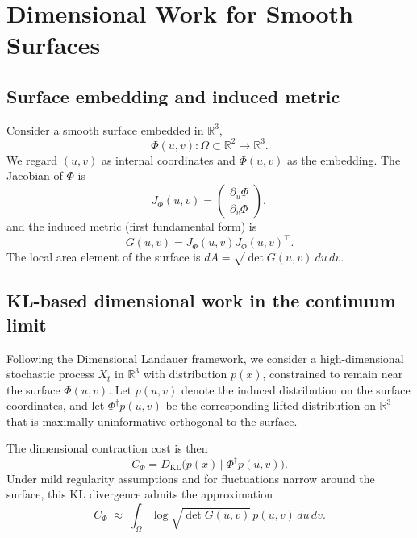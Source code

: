 \documentclass[aps,pre,twocolumn,superscriptaddress,floatfix]{revtex4-2}
\begin{document}
\section{Dimensional Work for Smooth Surfaces}

\subsection{Surface embedding and induced metric}

Consider a smooth surface embedded in $\mathbb{R}^3$,
\begin{equation}
\Phi(u,v): \Omega \subset \mathbb{R}^2 \to \mathbb{R}^3.
\end{equation}
We regard $(u,v)$ as internal coordinates and $\Phi(u,v)$ as the embedding. The Jacobian of $\Phi$ is
\begin{equation}
J_\Phi(u,v) =
\begin{pmatrix}
\partial_u \Phi \\[3pt]
\partial_v \Phi
\end{pmatrix},
\end{equation}
and the induced metric (first fundamental form) is
\begin{equation}
G(u,v) = J_\Phi(u,v) J_\Phi(u,v)^\top.
\end{equation}
The local area element of the surface is $dA = \sqrt{\det G(u,v)}\,du\,dv$.

\subsection{KL-based dimensional work in the continuum limit}

Following the Dimensional Landauer framework, we consider a high-dimensional stochastic process $X_t$ in $\mathbb{R}^3$ with distribution $p(x)$, constrained to remain near the surface $\Phi(u,v)$. Let $p(u,v)$ denote the induced distribution on the surface coordinates, and let $\Phi^\dagger p(u,v)$ be the corresponding lifted distribution on $\mathbb{R}^3$ that is maximally uninformative orthogonal to the surface.

The dimensional contraction cost is then
\begin{equation}
C_\Phi = D_{\mathrm{KL}}\big(p(x)\,\Vert\,\Phi^\dagger p(u,v)\big).
\end{equation}
Under mild regularity assumptions and for fluctuations narrow around the surface, this KL divergence admits the approximation
\begin{equation}
C_\Phi \;\approx\; \int_\Omega \log\sqrt{\det G(u,v)} \, p(u,v)\,du\,dv.
\label{eq:Cphi_surface}
\end{equation}
\end{document}
